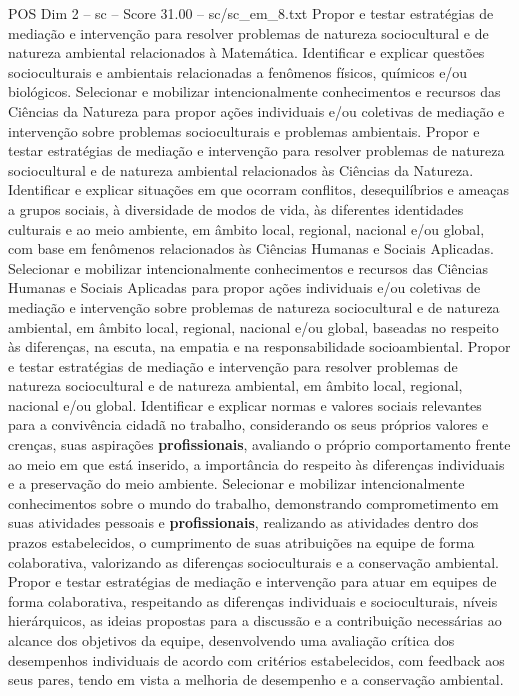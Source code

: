 \begin{textsample}{POS Dim 2 – sc – Score 31.00 – sc/sc\_em\_8.txt}
Propor e testar estratégias de mediação e intervenção para resolver problemas de natureza sociocultural e de natureza ambiental relacionados à Matemática.
Identificar e explicar questões socioculturais e ambientais relacionadas a fenômenos físicos, químicos e/ou biológicos.
Selecionar e mobilizar intencionalmente conhecimentos e recursos das Ciências da Natureza para propor ações individuais e/ou coletivas de mediação e intervenção sobre problemas socioculturais e problemas ambientais.
Propor e testar estratégias de mediação e intervenção para resolver problemas de natureza sociocultural e de natureza ambiental relacionados às Ciências da Natureza.
Identificar e explicar situações em que ocorram conflitos, desequilíbrios e ameaças a grupos sociais, à diversidade de modos de vida, às diferentes identidades culturais e ao meio ambiente, em âmbito local, regional, nacional e/ou global, com base em fenômenos relacionados às Ciências Humanas e Sociais Aplicadas.
Selecionar e mobilizar intencionalmente conhecimentos e recursos das Ciências Humanas e Sociais Aplicadas para propor ações individuais e/ou coletivas de mediação e intervenção sobre problemas de natureza sociocultural e de natureza ambiental, em âmbito local, regional, nacional e/ou global, baseadas no respeito às diferenças, na escuta, na empatia e na responsabilidade socioambiental.
Propor e testar estratégias de mediação e intervenção para resolver problemas de natureza sociocultural e de natureza ambiental, em âmbito local, regional, nacional e/ou global.
Identificar e explicar normas e valores sociais relevantes para a convivência cidadã no trabalho, considerando os seus próprios valores e crenças, suas aspirações \textbf{profissionais}, avaliando o próprio comportamento frente ao meio em que está inserido, a importância do respeito às diferenças individuais e a preservação do meio ambiente.
Selecionar e mobilizar intencionalmente conhecimentos sobre o mundo do trabalho, demonstrando comprometimento em suas atividades pessoais e \textbf{profissionais}, realizando as atividades dentro dos prazos estabelecidos, o cumprimento de suas atribuições na equipe de forma colaborativa, valorizando as diferenças socioculturais e a conservação ambiental.
Propor e testar estratégias de mediação e intervenção para atuar em equipes de forma colaborativa, respeitando as diferenças individuais e socioculturais, níveis hierárquicos, as ideias propostas para a discussão e a contribuição necessárias ao alcance dos objetivos da equipe, desenvolvendo uma avaliação crítica dos desempenhos individuais de acordo com critérios estabelecidos, com feedback aos seus pares, tendo em vista a melhoria de desempenho e a conservação ambiental.

\end{textsample}
